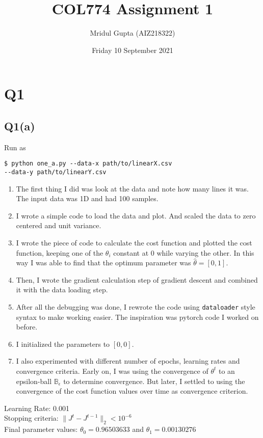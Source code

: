 \documentclass[11pt]{article}
\author{Mridul Gupta (AIZ218322)}
\date{Friday 10 September 2021}
\title{COL774 Assignment 1}
\begin{document}
\maketitle
\section{Q1}
\label{sec:orge4c8fb7}
\subsection{Q1(a)}
\label{sec:org99d1faf}
\begin{codebox}
Run as
\begin{verbatim}
$ python one_a.py --data-x path/to/linearX.csv
--data-y path/to/linearY.csv
\end{verbatim}
\end{codebox}
\begin{enumerate}
\item The first thing I did was look at the data and note how many
lines it was. The input data was 1D and had 100 samples.
\item I wrote a simple code to load the data and plot. And scaled
the data to zero centered and unit variance.
\item I wrote the piece of code to calculate the cost function
and plotted the cost function, keeping one of the \(\theta_i\)
constant at 0 while varying the other. In this way I was able to
find that the optimum parameter was \(\hat{\theta}=[0,1]\).
\item Then, I wrote the gradient calculation step of
gradient descent and combined it with the data loading step.
\item After all the debugging was done, I rewrote the code using
\texttt{dataloader} style syntax to make working easier. The
inspiration was pytorch code I worked on before.
\item I initialized the parameters to \([0,0]\).
\item I also experimented with different number of epochs, learning
rates and convergence criteria. Early on, I was using the
convergence of \(\theta^t\) to an epsilon-ball \(\mathbb{B}_{\epsilon}\)
to determine convergence. But later, I settled to using the
convergence of the cost function values over time as convergence criterion.
\end{enumerate}
Learning Rate: 0.001\\
Stopping criteria: \(\lVert J^{t}-J^{t-1}\rVert_2 < 10^{-6}\)\\
Final parameter values: \(\theta_0=0.96503633\) and \(\theta_1=0.00130276\)
\end{document}
